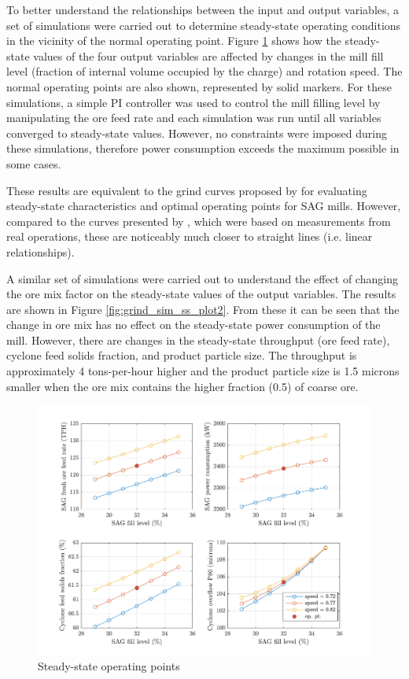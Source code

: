 To better understand the relationships between the input and output variables, a set of simulations were carried out to determine steady-state operating conditions in the vicinity of the normal operating point. Figure \ref{fig:grind_sim_ss_plot1} shows how the steady-state values of the four output variables are affected by changes in the mill fill level (fraction of internal volume occupied by the charge) and rotation speed. The normal operating points are also shown, represented by solid markers. For these simulations, a simple PI controller was used to control the mill filling level by manipulating the ore feed rate and each simulation was run until all variables converged to steady-state values. However, no constraints were imposed during these simulations, therefore power consumption exceeds the maximum possible in some cases.

These results are equivalent to the grind curves proposed by \cite{powell_applying_2009} for evaluating steady-state characteristics and optimal operating points for SAG mills. However, compared to the curves presented by \cite{powell_applying_2009}, which were based on measurements from real operations, these are noticeably much closer to straight lines (i.e. linear relationships).

A similar set of simulations were carried out to understand the effect of changing the ore mix factor on the steady-state values of the output variables. The results are shown in Figure \ref{fig:grind_sim_ss_plot2}. From these it can be seen that the change in ore mix has no effect on the steady-state power consumption of the mill. However, there are changes in the steady-state throughput (ore feed rate), cyclone feed solids fraction, and product particle size. The throughput is approximately 4 tons-per-hour higher and the product particle size is 1.5 microns smaller when the ore mix contains the higher fraction (0.5) of coarse ore.

\begin{figure}[htp]
	\centering
	\includegraphics[width=15cm]{images/grind_sim_ss_plot1.pdf}
	\caption{Steady-state operating points}
	\label{fig:grind_sim_ss_plot1}
\end{figure}

